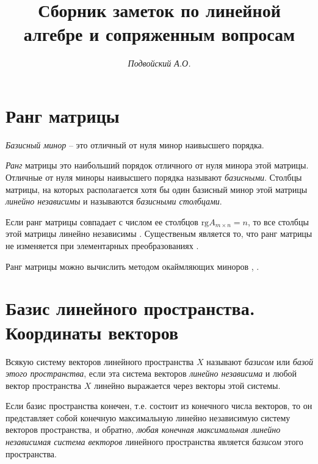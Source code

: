 \documentclass[%
	11pt,
	a4paper,
	utf8,
		]{article}
\begin{document}
\title{Сборник заметок по линейной алгебре и сопряженным вопросам}

\author{\itshape Подвойский А.О.}

\date{}
\maketitle

\thispagestyle{fancy}




\tableofcontents

\section{Ранг матрицы}

\emph{Базисный минор} -- это отличный от нуля минор наивысшего порядка.

\emph{Ранг} матрицы это наибольший порядок отличного от нуля минора этой матрицы. Отличные от нуля миноры наивысшего порядка называют \emph{базисными}. Столбцы матрицы, на которых располагается хотя бы один базисный минор этой матрицы \emph{линейно независимы} и называются \emph{базисными столбцами}.

Если ранг матрицы совпадает с числом ее столбцов $ \text{rg} A_{m \times n} = n $, то все столбцы этой матрицы линейно независимы \cite[]{shevtsov:linal-2012}. Существеным является то, что ранг матрицы не изменяется при элементарных преобразованиях \cite[]{shevtsov:linal-2012}.

Ранг матрицы можно вычислить методом окаймляющих миноров \cite{bortakovskiy:2005}, \cite[]{shevtsov:linal-2012}.

\section{Базис линейного пространства. Координаты векторов}

Всякую систему векторов линейного пространства $ X $ называют \emph{базисом} или \emph{базой этого пространства}, если эта система векторов \emph{линейно независима} и любой вектор пространства $ X $ линейно выражается через векторы этой системы.

Если базис пространства конечен, т.е. состоит из конечного числа векторов, то он представляет собой конечную максимальную линейно независимую систему векторов пространства, и обратно, \emph{любая конечная максимальная линейно независимая система векторов} линейного пространства является \emph{базисом} этого пространства.
\end{document}
